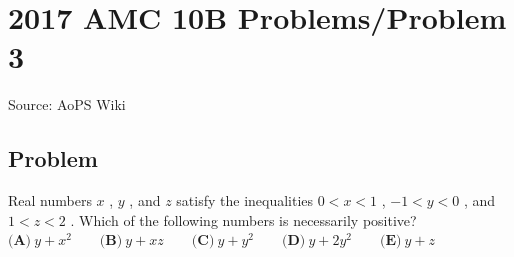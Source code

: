 \documentclass[12pt]{article}
\begin{document}
\section*{{2017 AMC 10B Problems/Problem 3}}
Source: AoPS Wiki

\subsection*{Problem}
Real numbers $x$ , $y$ , and $z$ satisfy the inequalities $0<x<1$ , $-1<y<0$ , and $1<z<2$ .
Which of the following numbers is necessarily positive? $\textbf{(A)}\ y+x^2\qquad\textbf{(B)}\ y+xz\qquad\textbf{(C)}\ y+y^2\qquad\textbf{(D)}\ y+2y^2\qquad\textbf{(E)}\ y+z$
\end{document}

